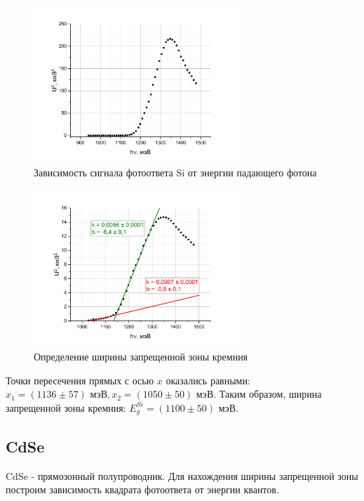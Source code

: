 \documentclass[a4paper,12pt]{article} %
\begin{document}
\begin{figure}[h!]
    \centering
    \includegraphics[width=0.69\textwidth]{Si_raw.png}
    \caption{Зависимость сигнала фотоответа Si от энергии падающего фотона}
    \label{fig:Si}
\end{figure}

\begin{figure}[h!]
    \centering
    \includegraphics[width=0.69\textwidth]{Si.png}
    \caption{Определение ширины запрещенной зоны кремния}
    \label{fig:Si}
\end{figure}



Точки пересечения прямых с осью $x$ оказались равными: $x_{1} =  (1136 \pm 57) \text{ мэВ}, x_{2} = (1050 \pm 50) \text{ мэВ} $. Таким образом, ширина запрещенной зоны кремния: $ E_{g}^{Si} = (1100 \pm 50) \text{ мэВ}$.



\subsection{CdSe}
CdSe - прямозонный полупроводник. Для нахождения 
ширины запрещенной зоны построим зависимость квадрата фотоответа от энергии квантов.
\end{document}
